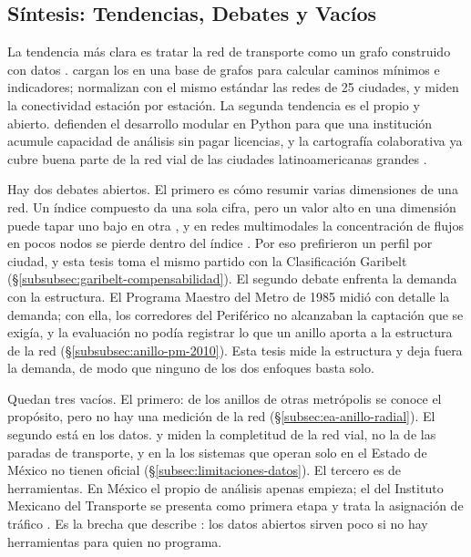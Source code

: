 
\subsection{Síntesis: Tendencias, Debates y Vacíos}
\label{subsec:ea-sintesis}

La tendencia más clara es tratar la red de transporte como un grafo construido
con datos \gtfs{}. \citet{fortin2016innovative} cargan los  en
una base de grafos para calcular caminos mínimos e indicadores;
\citet{kujala2018} normalizan con el mismo estándar las redes de 25 ciudades, y
\citet{ugur2025} miden la conectividad estación por estación. La segunda
tendencia es el  propio y abierto. \citet{moreno2023}
defienden el desarrollo modular en Python para que una institución acumule
capacidad de análisis sin pagar licencias, y la cartografía colaborativa ya
cubre buena parte de la red vial de las ciudades latinoamericanas grandes
\citep{barrington2017world}.

Hay dos debates abiertos. El primero es cómo resumir varias dimensiones de una
red. Un índice compuesto da una sola cifra, pero un valor alto en una dimensión
puede tapar uno bajo en otra \citep{hossain2024}, y en redes multimodales la
concentración de flujos en pocos nodos se pierde dentro del índice
\citep{deng2023}. Por eso \citet{kujala2018} prefirieron un perfil por ciudad,
y esta tesis toma el mismo partido con la Clasificación Garibelt
(§\ref{subsubsec:garibelt-compensabilidad}). El segundo debate enfrenta la
demanda con la estructura. El Programa Maestro del Metro de 1985 midió con
detalle la demanda; con ella, los corredores del Periférico no alcanzaban la
captación que se exigía, y la evaluación no podía registrar lo que un anillo
aporta a la estructura de la red (§\ref{subsubsec:anillo-pm-2010}). Esta tesis
mide la estructura y deja fuera la demanda, de modo que ninguno de los dos
enfoques basta solo.

Quedan tres vacíos. El primero: de los anillos de otras metrópolis se conoce el
propósito, pero no hay una medición de la red (§\ref{subsec:ea-anillo-radial}).
El segundo está en los datos. \citet{haklay2010good} y
\citet{barrington2017world} miden la completitud de la red vial, no la de las
paradas de transporte, y en la \zmvm{} los sistemas que operan solo en el
Estado de México no tienen \gtfs{} oficial (§\ref{subsec:limitaciones-datos}).
El tercero es de herramientas. En México el  propio de
análisis apenas empieza; el del Instituto Mexicano del Transporte se presenta
como primera etapa y trata la asignación de tráfico \citep{moreno2023}. Es la
brecha que describe \citet{gurstein2011open}: los datos abiertos sirven poco si
no hay herramientas para quien no programa.


